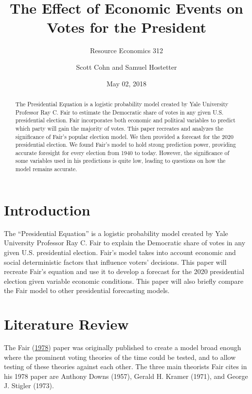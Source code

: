 \documentclass[11,]{article}
\title{The Effect of Economic Events on Votes for the President}
\subtitle{Resource Economics 312}
\author{Scott Cohn and Samuel Hostetter}
\date{May 02, 2018}
\providecommand{\tightlist}{%
  \setlength{\itemsep}{0pt}\setlength{\parskip}{0pt}}
\begin{document}
\maketitle
\begin{abstract}
The Presidential Equation is a logistic probability model created by
Yale University Professor Ray C. Fair to estimate the Democratic share
of votes in any given U.S. presidential election. Fair incorporates both
economic and political variables to predict which party will gain the
majority of votes. This paper recreates and analyzes the significance of
Fair's popular election model. We then provided a forecast for the 2020
presidential election. We found Fair's model to hold strong prediction
power, providing accurate foresight for every election from 1940 to
today. However, the significance of some variables used in his
predictions is quite low, leading to questions on how the model remains
accurate.
\end{abstract}

\providecommand{\tightlist}{%
  \setlength{\itemsep}{0pt}\setlength{\parskip}{0pt}}

\hypertarget{introduction}{%
\section{Introduction}\label{introduction}}

The ``Presidential Equation'' is a logistic probability model created by
Yale University Professor Ray C. Fair to explain the Democratic share of
votes in any given U.S. presidential election. Fair's model takes into
account economic and social deterministic factors that influence voters'
decisions. This paper will recreate Fair's equation and use it to
develop a forecast for the 2020 presidential election given variable
economic conditions. This paper will also briefly compare the Fair model
to other presidential forecasting models.

\hypertarget{literature-review}{%
\section{Literature Review}\label{literature-review}}

The Fair (\protect\hyperlink{ref-fair_effect_1978}{1978}) paper was
originally published to create a model broad enough where the prominent
voting theories of the time could be tested, and to allow testing of
these theories against each other. The three main theorists Fair cites
in his 1978 paper are Anthony Downs (1957), Gerald H. Kramer (1971), and
George J. Stigler (1973).
\end{document}
